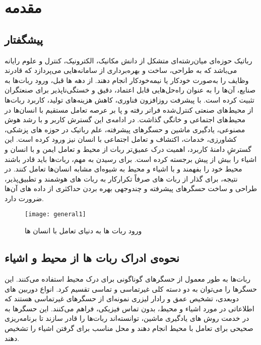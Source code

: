 
\chapter{مقدمه}
\section{پیشگفتار}
رباتیک حوزه‌ای میان‌رشته‌ای متشکل از دانش مکانیک، الکترونیک، کنترل و علوم رایانه می‌باشد که به طراحی، ساخت و بهره‌برداری از سامانه‌هایی می‌پردازد که قادرند وظایف را به‌صورت خودکار یا نیمه‌خودکار انجام دهند.
\cite{wallen2008history}
 از دهه ها قبل، ورود ربات‌ها به صنایع، آن‌ها را به عنوان راه‌حل‌هایی قابل اعتماد، دقیق و خستگی‌ناپذیر برای صنعتگران تثبیت کرده است. با پیشرفت روزافزون فناوری، کاهش هزینه‌های تولید، کاربرد ربات‌ها از محیط‌های صنعتی کنترل‌شده فراتر رفته و پا بر عرصه‌ تعامل مستقیم با انسان‌ها در محیط‌های اجتماعی و خانگی گذاشت. 
 \cite{broadbent2017interactions,dahiya2013robotic}
 در ادامه‌ی این گسترش کاربر و با رشد هوش مصنوعی، یادگیری ماشین و حسگرهای پیشرفته، علم رباتیک در حوزه های پزشکی، کشاورزی، خدمات، اکتشاف و تعامل اجتماعی با انسان نیز ورود کرده است.
 \cite{wang2024multimodal,sheridan2016human}
  این گسترشِ دامنهٔ کاربرد، اهمیت درک عمیق‌تر ربات از محیط و تعامل ایمن و با انسان و اشیاء را بیش از پیش برجسته کرده است. برای رسیدن به مهم، ربات‌ها باید قادر باشند محیط خود را بفهمند و با اشیاء و محیط به شیوه‌ای مشابه انسان‌ها تعامل کنند. در نتیجه، برای گذار از ربات های صرفاً تکرارکار به ربات ‌های هوشمند و تطبیق‌پذیر، طراحی و ساخت حسگرهای پیشرفته و چندوجهی
  بهره بردن حداکثری از داده های آن‌ها ضرورت دارد.
  \cite{wang2024multimodal}
  
 \begin{figure}[ht]
 	\centerline{\texttt{[image: general1]}}
 	\caption{ورود ربات ها به دنیای تعامل با انسان ها
 	}
 	\label{fig:sampleDiagram}
 \end{figure}


\section{نحوه‌ی ادراک  ربات ها از محیط و اشیاء}
ربات‌ها به طور معمول از حسگرهای گوناگونی برای درک محیط استفاده می‌کنند. این حسگرها را می‌توان به دو دسته  کلی غیرتماسی و تماسی تقسیم کرد. انواع دوربین های دوبعدی، تشخیص عمق و رادار لیزری
نمونه‌ای از حسگرهای غیرتماسی هستند که اطلاعاتی در مورد اشیاء و محیط، بدون تماس فیزیکی، فراهم می‌کنند. این حسگرها به در خدمت روش های یادگیری ماشین، توانسته‌اند ربات‌ها را قادر سازند تا برنامه‌ریزی صحیحی برای تعامل با محیط انجام دهند و محل مناسب برای گرفتن اشیاء را تشخیص دهند.
\cite{tian2023data,hosseini2024multi,beigy2024explorable,sabzejou20232d,moghadam2023grasp}
